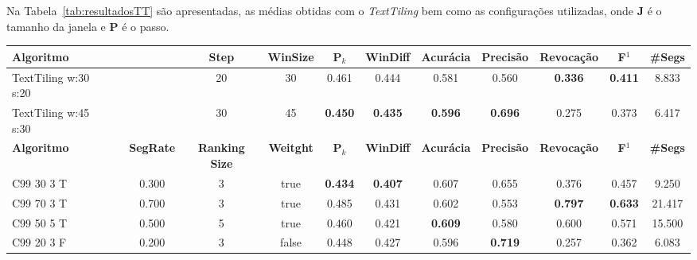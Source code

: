 \documentclass{article}
\begin{document}
 


Na Tabela~\ref{tab:resultadosTT} são apresentadas, as médias obtidas com o \textit{TextTiling} bem como as configurações utilizadas, onde \textbf{J} é o tamanho da janela e \textbf{P} é o passo.



\begin{table}[!h]
	\centering
	\begin{tabular}{|l||c|c|c|c|c|c|c|c|c|c|c|} \hline

		\textbf{Algoritmo} &&& 
		\textbf{Step} &
		\textbf{WinSize} & 
		\textbf{P$_k$} & 
		\textbf{WinDiff} & 
		\textbf{Acurácia} & 
		\textbf{Precisão} & 
		\textbf{Revocação} &
		\textbf{F$^1$} &
		\textbf{\#Segs} \\	\hline

TextTiling w:30 s:20 &&& 20 & 30 & 0.461 & 0.444 & 0.581 & 0.560 & \cellcolor{gray!20} \textbf{0.336} & \cellcolor{gray!20} \textbf{0.411} & 8.833  \\ \hline 

 TextTiling w:45 s:30 &&& 30 & 45 & \cellcolor{gray!20} \textbf{0.450} & \cellcolor{gray!20} \textbf{0.435} & \cellcolor{gray!20} \textbf{0.596} & \cellcolor{gray!20} \textbf{0.696} & 0.275 & 0.373 & 6.417  \\ \hline 

\hline
		\textbf{Algoritmo} &&
		\textbf{SegRate}& 
		\textbf{Ranking Size} &
		\textbf{Weitght} & 
		\textbf{P$_k$} & 
		\textbf{WinDiff} & 
		\textbf{Acurácia} & 
		\textbf{Precisão} & 
		\textbf{Revocação} &
		\textbf{F$^1$} &
		\textbf{\#Segs} \\	\hline

 C99 30  3 T && 0.300 & 3 & true & \cellcolor{gray!20} \textbf{0.434} & \cellcolor{gray!20} \textbf{0.407} & 0.607 & 0.655 & 0.376 & 0.457 & 9.250  \\ \hline 

 C99 70  3 T && 0.700 & 3 & true & 0.485 & 0.431 & 0.602 & 0.553 & \cellcolor{gray!20} \textbf{0.797} & \cellcolor{gray!20} \textbf{0.633} & 21.417  \\ \hline 

 C99 50  5 T && 0.500 & 5 & true & 0.460 & 0.421 & \cellcolor{gray!20} \textbf{0.609} & 0.580 & 0.600 & 0.571 & 15.500  \\ \hline 

 C99 20  3 F && 0.200 & 3 & false & 0.448 & 0.427 & 0.596 & \cellcolor{gray!20} \textbf{0.719} & 0.257 & 0.362 & 6.083  \\ \hline 



\end{tabular}
\end{table}
\end{document}
